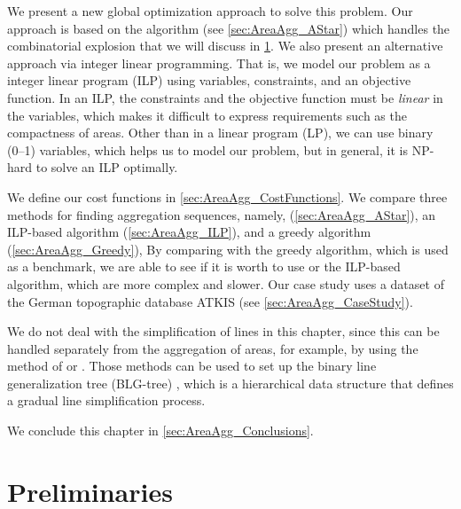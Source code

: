 We present a new global optimization approach to solve this 
problem. 
Our approach is based on the \Astar algorithm 
(see \sect\ref{sec:AreaAgg_AStar}) 
which handles the combinatorial explosion that 
we will discuss in \sect\ref{sec:AreaAgg_Preliminaries}.
We also present an alternative approach via integer linear
programming.  That is, we model our problem as a integer linear
program (ILP) using variables, constraints, and an objective
function.  In an ILP, the constraints and the objective function must
be \emph{linear} in the variables, which makes it difficult to express
requirements such as the compactness of areas.  Other than in a linear
program (LP), we can use binary (0--1) variables, which helps us to
model our problem, but in general, it is NP-hard to solve an ILP
optimally.  

We define our cost functions in \sect\ref{sec:AreaAgg_CostFunctions}.
We compare three methods for finding aggregation sequences, namely,
\Astar (\sect\ref{sec:AreaAgg_AStar}), 
an ILP-based algorithm (\sect\ref{sec:AreaAgg_ILP}), and
a greedy algorithm (\sect\ref{sec:AreaAgg_Greedy}), 
By comparing with the greedy algorithm, 
which is used as a benchmark,
we are able to see if it is worth 
to use \Astar or the ILP-based algorithm, 
which are more complex and slower.  Our case study 
uses a dataset of the German topographic database ATKIS 
(see \sect\ref{sec:AreaAgg_CaseStudy}).  

We do not deal with the simplification of lines in this chapter, 
since this can be handled separately from the
aggregation of areas, for example, 
by using the method of \citet{Douglas1973} 
or \citet{Saalfeld1999}.
Those methods can be used to set up 
the binary line generalization tree (BLG-tree)
\citep{vanOosterom1995Development},
which is a hierarchical data structure that 
defines a gradual line simplification process.

We conclude this chapter in \sect\ref{sec:AreaAgg_Conclusions}.

\section{Preliminaries}
\label{sec:AreaAgg_Preliminaries}


